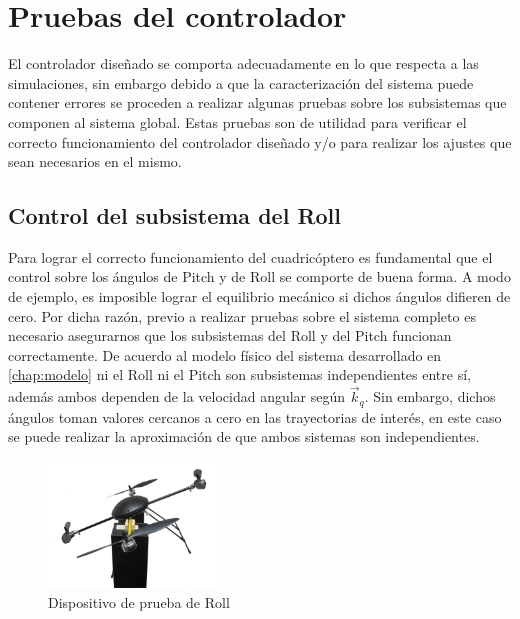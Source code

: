 \documentclass[main]{subfiles}
\begin{document}
\chapter{Pruebas del controlador}
El controlador diseñado se comporta adecuadamente en lo que respecta a las simulaciones, sin embargo debido a que la caracterizaci\'on del sistema puede contener errores se proceden a realizar algunas pruebas sobre los subsistemas que componen al sistema global. Estas pruebas son de utilidad para verificar el correcto funcionamiento del controlador diseñado y/o para realizar los ajustes que sean necesarios en el mismo.

\section{Control del subsistema del Roll}

Para lograr el correcto funcionamiento del cuadric\'optero es fundamental que el control sobre los \'angulos de Pitch y de Roll se comporte de buena forma. A modo de ejemplo, es imposible lograr el equilibrio mec\'anico si dichos \'angulos difieren de cero. Por dicha raz\'on, previo a realizar pruebas sobre el sistema completo es necesario asegurarnos que los subsistemas del  Roll y del Pitch funcionan correctamente. De acuerdo al modelo f\'isico del sistema desarrollado en \ref{chap:modelo} ni el Roll ni el Pitch son subsistemas independientes entre s\'i, adem\'as ambos dependen de la velocidad angular seg\'un $\vec{k}_q$. Sin embargo, dichos \'angulos toman valores cercanos a cero en las trayectorias de inter\'es, en este caso se puede realizar la aproximaci\'on de que ambos sistemas son independientes.\\

\begin{figure}
	\vspace{-20pt}
	\centering
	\includegraphics[width=0.4\textwidth]{./pics_test_control/dispositivo_psi.pdf}
	\caption{Dispositivo de prueba de Roll}
	\label{fig:psidisp}
\end{figure}
\end{document}
